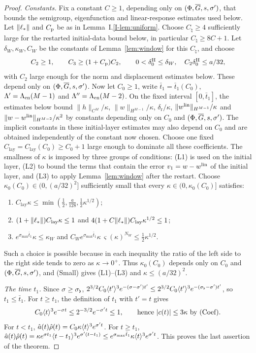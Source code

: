 \begin{proof}
\emph{Constants.} Fix a constant $C\ge1$, depending only on
$(\Phi,\overline{G},s,\sigma')$, that bounds the semigroup, eigenfunction and
linear-response estimates used below. Let $\|\ell_*\|$ and $C_{\mathrm{p}}$ be as in
Lemma~I.\ref{I-lem:uniform}. Choose $C_\natural\ge4$ sufficiently large for
the restarted initial-data bound below, in particular $C_\natural\ge8C+1$.
Let $\delta_W,\kappa_W,C_W$ be the constants of Lemma~\ref{lem:window} for
this $C_\natural$, and choose
\[
C_2\ge1,\qquad C_3\ge(1+C_{\mathrm{p}})C_2,\qquad
0<\delta_0^{\mathrm{H}}\le\delta_W,\quad C_2\delta_0^{\mathrm{H}}\le a/32,
\]
with $C_2$ large enough for the norm and displacement estimates below.
These depend only on $(\Phi,\overline{G},s,\sigma')$. Now let $C_0\ge1$, write
$\bar t_1=\bar t_1(C_0)$, $\Lambda'=\Lambda_{\mathrm{en}}(M-1)$ and $\Lambda''=\Lambda_{\mathrm{en}}(M-2)$.
On the fixed interval $[0,\bar t_1]$, the estimates below bound
$\|h\|_{C^M}/\kappa$, $\|w\|_{H^{M-1}}/\kappa$,
$\delta_{\mathrm r}/\kappa$, $\|w^{\mathrm{lin}}\|_{H^{M-1}}/\kappa$ and
$\|w-w^{\mathrm{lin}}\|_{H^{M-2}}/\kappa^2$ by constants depending only on $C_0$ and
$(\Phi,\overline{G},s,\sigma')$. The implicit constants in these initial-layer
estimates may also depend on $C_0$ and are obtained independently of the
constant now chosen. Choose one fixed $C_{\mathrm{lay}}=C_{\mathrm{lay}}(C_0)\ge C_0+1$ large enough to
dominate all these coefficients.
The smallness of $\kappa$ is imposed by three groups of conditions: (L1) is used on
the initial layer, (L2) to bound the terms that contain the error $v_1=w-w^{\mathrm{lin}}$ of
the initial layer, and (L3) to apply Lemma~\ref{lem:window} after the restart.
Choose $\kappa_0(C_0)\in(0,(a/32)^2]$ sufficiently small that every
$\kappa\in(0,\kappa_0(C_0)]$ satisfies:
\begin{enumerate}[label=\textup{(L\arabic*)}]
\item $C_{\mathrm{lay}}\kappa\le\min(\frac12,\frac a{128},\frac12\kappa^{1/2})$;
\item $(1+\|\ell_*\|)C_{\mathrm{lay}}\kappa\le1$ and
  $4(1+C\|\ell_*\|)C_{\mathrm{lay}}\kappa^{1/2}\le1$;
\item $e^{\sigma_{\max}\bar t_1}\kappa\le\kappa_W$ and
  $C_We^{\sigma_{\max}\bar t_1}\kappa\,\varsigma(\kappa)^{N_W}\le\frac12\kappa^{1/2}$.
\end{enumerate}
Such a choice is possible because in each inequality the ratio of the left
side to the right side tends to zero as $\kappa\to0^+$. Thus $\kappa_0(C_0)$
depends only on $C_0$ and $(\Phi,\overline{G},s,\sigma')$, and (Small) gives
(L1)--(L3) and $\kappa\le(a/32)^2$.

\emph{The time $t_1$.} Since $\sigma\ge\sigma_\flat$,
$2^{3/2}C_0\langle t'\rangle^3e^{-(\sigma-\sigma')t'}\le2^{3/2}C_0\langle t'\rangle^3e^{-(\sigma_\flat-\sigma')t'}$, so
$t_1\le\bar t_1$. For $t\ge t_1$, the definition of $t_1$ with $t'=t$ gives
\begin{equation}
\label{eq:A-t1}
C_0\langle t\rangle^3e^{-\sigma t}\le2^{-3/2}e^{-\sigma't}\le1,\qquad\text{hence }|c(t)|\le3\kappa\text{ by (Coef)}.
\end{equation}
For $t<t_1$,
$\hat a(t)\hat\rho(t)=C_0\kappa\langle t\rangle^3e^{\sigma't}$. For $t\ge t_1$,
$\hat a(t)\hat\rho(t)=\kappa e^{\sigma t_1}\langle t-t_1\rangle^3e^{\sigma'(t-t_1)}\le e^{\sigma_{\max}\bar t_1}\kappa\langle t\rangle^3e^{\sigma't}$.
This proves the last assertion of the theorem.


\end{proof}
